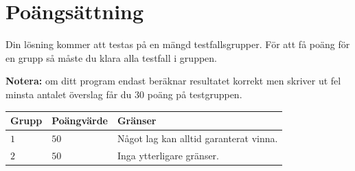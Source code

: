 \section*{Poängsättning}
Din lösning kommer att testas på en mängd testfallsgrupper.
För att få poäng för en grupp så måste du klara alla testfall i gruppen.

\textbf{Notera:} om ditt program endast beräknar resultatet korrekt men skriver ut fel minsta antalet överslag får du $30$ poäng på testgruppen.

\noindent
\begin{tabular}{| l | l | p{12cm} |}
  \hline
  Grupp & Poängvärde & Gränser \\ \hline
  $1$    & $50$        & Något lag kan alltid garanterat vinna.\\ \hline 
  $2$    & $50$        & Inga ytterligare gränser. \\ \hline 
\end{tabular}


